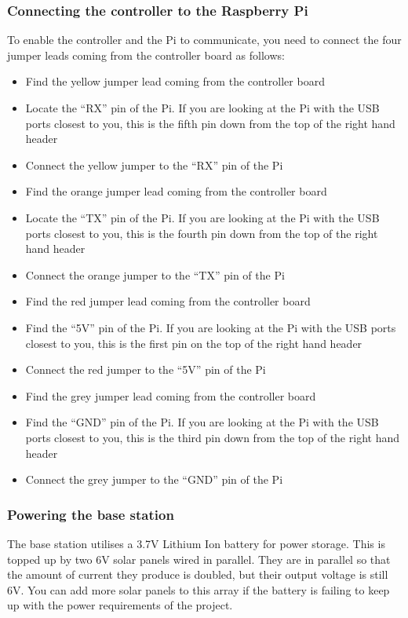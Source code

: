 \documentclass[10pt]{article}
\begin{document}
\subsubsection{Connecting the controller to the Raspberry Pi}

To enable the controller and the Pi to communicate, you need to connect the four jumper leads coming from the controller board as follows:

\begin{itemize}
 \item Find the yellow jumper lead coming from the controller board
 \item Locate the ``RX'' pin of the Pi. If you are looking at the Pi with the USB ports closest to you, this is the fifth pin down from the top of the right hand header
 \item Connect the yellow jumper to the ``RX'' pin of the Pi
 \item Find the orange jumper lead coming from the controller board
 \item Locate the ``TX'' pin of the Pi. If you are looking at the Pi with the USB ports closest to you, this is the fourth pin down from the top of the right hand header
 \item Connect the orange jumper to the ``TX'' pin of the Pi
 \item Find the red jumper lead coming from the controller board
 \item Find the ``5V'' pin of the Pi. If you are looking at the Pi with the USB ports closest to you, this is the first pin on the top of the right hand header
 \item Connect the red jumper to the ``5V'' pin of the Pi
 \item Find the grey jumper lead coming from the controller board
 \item Find the ``GND'' pin of the Pi. If you are looking at the Pi with the USB ports closest to you, this is the third pin down from the top of the right hand header
 \item Connect the grey jumper to the ``GND'' pin of the Pi
\end{itemize}

\subsubsection{Powering the base station}
The base station utilises a 3.7V Lithium Ion battery for power storage. This is topped up by two 6V solar panels wired in parallel. They are in parallel so that the amount of current they produce is doubled, but their output voltage is still 6V. You can add more solar panels to this array if the battery is failing to keep up with the power requirements of the project.
\end{document}
